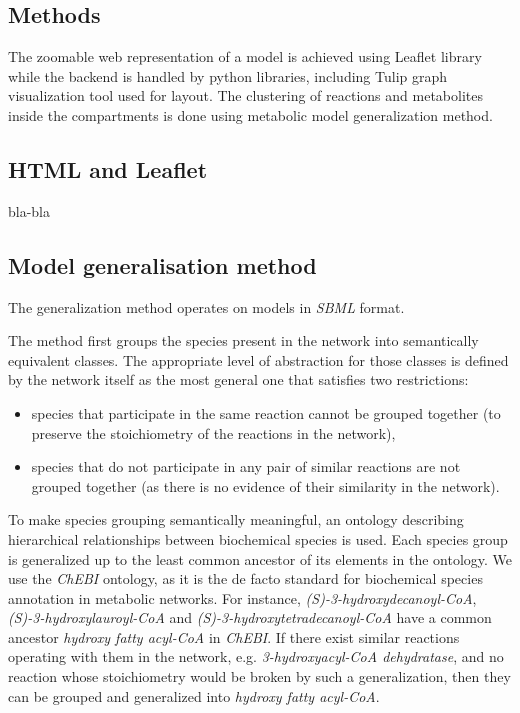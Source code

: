 \documentclass{bioinfo}
\begin{document}
\begin{methods}
\section{Methods}

The zoomable web representation of a model is achieved using Leaflet library while the backend is handled by python libraries, including Tulip graph visualization tool used for layout. The clustering of reactions and metabolites inside the compartments is done using metabolic model generalization method.

\subsection*{HTML and Leaflet}

bla-bla


\subsection*{Model generalisation method}
The generalization method\cite{Zhukova2013} operates on models in \textit{SBML}\cite{Hucka08} format.

\label{restrictions}
The method first groups the species present in the network into semantically equivalent classes. The appropriate level of abstraction for those classes is defined by the network itself as the most general one that satisfies two restrictions: 
\begin{itemize}
 \item species that participate in the same reaction cannot be grouped together (to preserve the stoichiometry of the reactions in the network),
 \item species that do not participate in any pair of similar reactions are not grouped together (as there is no evidence of their similarity in the network).
\end{itemize}
To make species grouping semantically meaningful, an ontology describing hierarchical relationships between biochemical species is used. Each species group is generalized up to the least common ancestor of its elements in the ontology. We use the \textit{ChEBI} ontology, as it is the de facto standard for biochemical species annotation in metabolic networks. %
For instance, \textit{(S)-3-hydroxydecanoyl-CoA}, \textit{(S)-3-hydroxylauroyl-CoA} and \textit{(S)-3-hydroxytetradecanoyl-CoA} have a common ancestor \textit{hydroxy fatty acyl-CoA} in \textit{ChEBI}. If there exist similar reactions operating with them in the network, e.g. \textit{3-hydroxyacyl-CoA dehydratase}, and no reaction whose stoichiometry would be broken by such a generalization, then they can be grouped and generalized into \textit{hydroxy fatty acyl-CoA}.


\end{methods}
\end{document}
